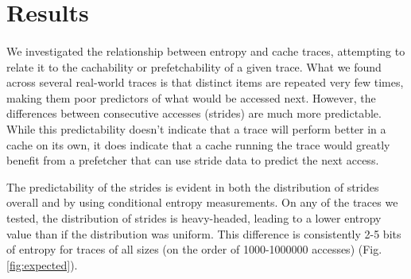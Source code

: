 \section{Results}


\paragraph{}
We investigated the relationship between entropy and cache traces, attempting to relate it to the cachability or prefetchability of a given trace.  What we found across several real-world traces is that distinct items are repeated very few times, making them poor predictors of what would be accessed next.  However, the differences between consecutive accesses (strides) are much more predictable.  While this predictability doesn't indicate that a trace will perform better in a cache on its own, it does indicate that a cache running the trace would greatly benefit from a prefetcher that can use stride data to predict the next access.

The predictability of the strides is evident in both the distribution of strides overall and by using conditional entropy measurements.  On any of the traces we tested, the distribution of strides is heavy-headed, leading to a lower entropy value than if the distribution was uniform.  This difference is consistently 2-5 bits of entropy for traces of all sizes (on the order of 1000-1000000 accesses) (Fig. \ref{fig:expected}).

